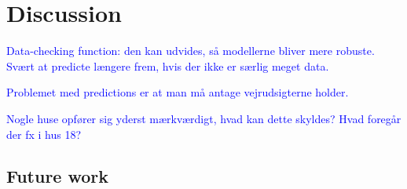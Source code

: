 \chapter{Discussion}

\textcolor{blue}{Data-checking function: den kan udvides, så modellerne bliver mere robuste. Svært at predicte længere frem, hvis der ikke er særlig meget data.} 

\textcolor{blue}{Problemet med predictions er at man må antage vejrudsigterne holder.} 

\textcolor{blue}{Nogle huse opfører sig yderst mærkværdigt, hvad kan dette skyldes? Hvad foregår der fx i hus 18?}

\begin{itemize}
    
\end{itemize}

\section{Future work}